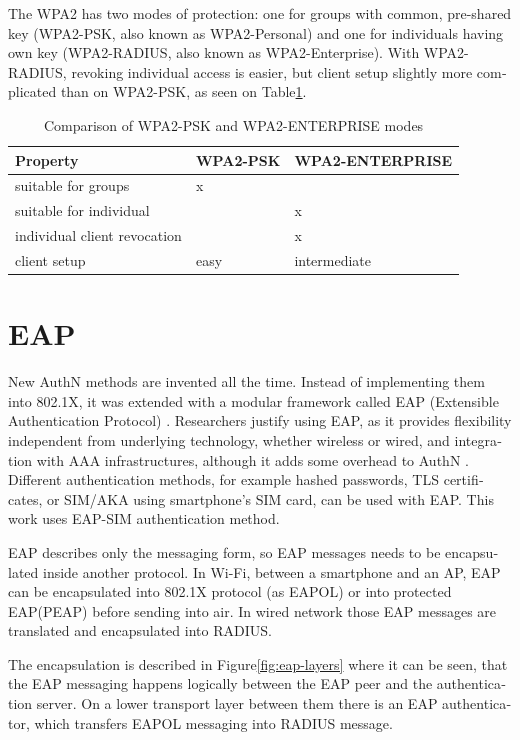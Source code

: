 \documentclass[12pt,a4paper,english]{tutthesis}
\begin{document}
\begin{otherlanguage}{english}
The WPA2 has two modes of protection: one for groups with common, pre-shared
key (WPA2-PSK, also known as WPA2-Personal) and one for individuals
having own key (WPA2-RADIUS, also known as  WPA2-Enterprise).  With
WPA2-RADIUS, revoking
individual access is easier, but client setup slightly more
complicated than on WPA2-PSK, as seen on Table\ref{psk-enterprise}.

\begin{table}[htb]
\caption{\label{psk-enterprise}Comparison of WPA2-PSK and WPA2-ENTERPRISE modes}
\centering
\begin{tabular}{l|l|l}
Property & WPA2-PSK & WPA2-ENTERPRISE\\
\hline
suitable for groups & x & \\
suitable for individual &  & x\\
individual client revocation &  & x\\
client setup & easy & intermediate\\
\hline
\end{tabular}
\end{table}


\section{EAP}
\label{sec-2-4}

New AuthN methods are invented all the time.
Instead of implementing them into 802.1X, it was 
extended with a modular framework called 
 EAP (Extensible Authentication Protocol) \cite{rfc5247}. 
Researchers justify using EAP, as it
provides flexibility independent from underlying technology, whether
wireless or wired,  and integration with AAA infrastructures, although
it adds some overhead to AuthN \cite{pereniguez10}.
Different authentication methods, for example hashed passwords, TLS
 certificates, or SIM/AKA using smartphone's SIM card,  can
be used with EAP.
This work uses EAP-SIM authentication method.


EAP describes only the messaging form, so EAP messages needs to
be encapsulated inside another protocol.  In Wi-Fi, between a smartphone
and an AP, EAP can be encapsulated into 802.1X protocol (as EAPOL) or
into protected EAP(PEAP) \cite{peap} before sending
into air. In wired network those EAP messages are translated and encapsulated into RADIUS.

The encapsulation is described in Figure\ref{fig:eap-layers} where it can be
seen, that the EAP messaging happens logically between the EAP peer and
the authentication server. On a lower transport layer between them
there is an EAP authenticator, which transfers EAPOL messaging into
RADIUS message.


\end{otherlanguage}
\end{document}
